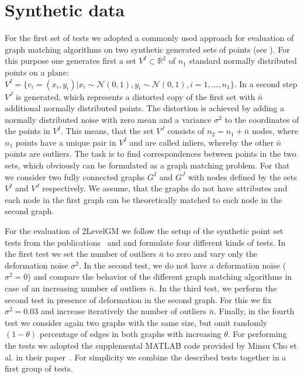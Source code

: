 \section{Synthetic data}
For the first set of tests we adopted a commonly used approach for evaluation of graph matching algorithms on two synthetic generated sets of points (see \cite{Cho2010_RRWM,Cho2014_Haystack,Leordeanu2009_IPFP}). 
For this purpose one generates first a set $V^I\subset\mathbb{R}^2$ of $n_1$ standard normally distributed points on a plane: $V^I=\{v_i=(x_i,y_i)|x_i\sim\mathcal{N}(0,1),y_i\sim\mathcal{N}(0,1),i=1,\dots,n_1\}$. In a second step $V^J$ is generated, which represents a distorted copy of the first set with $\bar{n}$ additional normally distributed points. The distortion is achieved by adding a normally distributed noise with zero mean and a variance $\sigma^2$ to the coordinates of the points in $V^I$. 
This means, that the set $V^J$ consists of $n_2=n_1+\bar{n}$ nodes, where $n_1$ points have a unique pair in $V^I$ and are called inliers, whereby the other $\bar{n}$ points are outliers. The task is to find correspondences between points in the two sets, which obviously can be formulated as a graph matching problem. For that we consider two fully connected graphs $G^I$ and $G^J$ with nodes defined by the sets $V^I$ and $V^J$ respectively. We assume, that the graphs do not have attributes and each node in the first graph can be theoretically matched to each node in the second graph.

For the evaluation of 2LevelGM we follow the setup of the synthetic point set tests from the publications~\cite{Cho2014_Haystack} and \cite{FastPFP} and formulate four different kinds of tests. In the first test we set the number of outliers $\bar{n}$ to zero and vary only the deformation noise $\sigma^2$. In the second test, we do not have a deformation noise ($\sigma^2=0$) and compare the behavior of the different graph matching algorithms in case of an increasing number of outliers $\bar{n}$. In the third test, we perform the second test in presence of deformation in the second graph. For this we fix $\sigma^2= 0.03$ and increase iteratively the number of outliers $\bar{n}$. Finally, in the fourth test we consider again two graphs with the same size, but omit randomly $(1-\theta)$ percentage of edges in both graphs with increasing $\theta$. 
For performing the tests we adopted the supplemental MATLAB code provided by Minsu Cho et al. in their paper~\cite{Cho2014_Haystack}. For simplicity we combine the described tests together in a first group of tests. %

